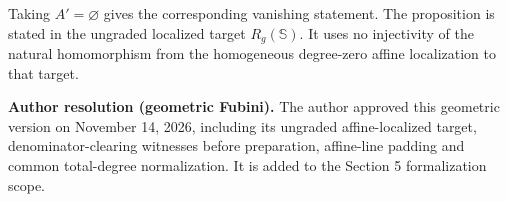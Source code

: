 \begin{rem}
Taking $A'=\varnothing$ gives the corresponding vanishing statement.
The proposition is stated in the ungraded localized target
$R_g(\mathbb S)$. It uses no injectivity of the natural homomorphism
from the homogeneous degree-zero affine localization to that target.
\end{rem}

{\normalfont\small\color{ResolutionGreen}
\noindent\textbf{Author resolution (geometric Fubini).}
The author approved this geometric version on November 14, 2026,
including its ungraded affine-localized target, denominator-clearing
witnesses before preparation, affine-line padding and common total-degree
normalization. It is added to the Section 5 formalization scope.\par}

